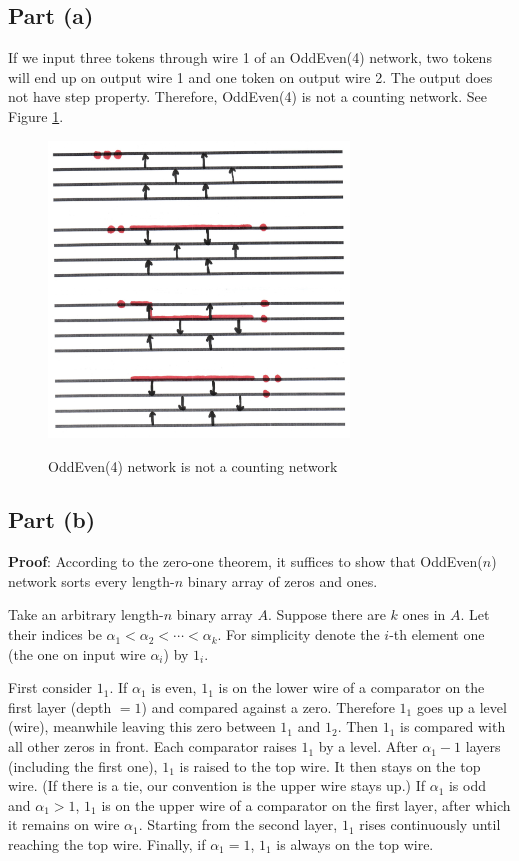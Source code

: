 \documentclass{article}
\begin{document}
\subsection{Part (a)}
If we input three tokens through wire 1 of an OddEven(4) network, two tokens will end up on output wire 1 and one token on output wire 2. The output does not have step property. Therefore, OddEven(4) is not a counting network. See Figure \ref{oddeven}.
\begin{figure}[!htbp]
\centering
\includegraphics[width=8cm]{oddeven.jpg}\\
\caption{OddEven(4) network is not a counting network}\label{oddeven}
\end{figure}

\subsection{Part (b)}
\noindent\textbf{Proof}:
According to the zero-one theorem, it suffices to show that OddEven($n$) network sorts every length-$n$ binary array of zeros and ones.

Take an arbitrary length-$n$ binary array $A$. Suppose there are $k$ ones in $A$. Let their indices be $\alpha_1<\alpha_2<\cdots<\alpha_k$. For simplicity denote the $i$-th element one (the one on input wire $\alpha_i$) by $1_i$.

First consider $1_1$. If $\alpha_1$ is even, $1_1$ is on the lower wire of a comparator on the first layer (depth $=1$) and compared against a zero. Therefore $1_1$ goes up a level (wire), meanwhile leaving this zero between $1_1$ and $1_2$. Then $1_1$ is compared with all other zeros in front. Each comparator raises $1_1$ by a level. After $\alpha_1-1$ layers (including the first one), $1_1$ is raised to the top wire. It then stays on the top wire. (If there is a tie, our convention is the upper wire stays up.) If $\alpha_1$ is odd and $\alpha_1>1$, $1_1$ is on the upper wire of a comparator on the first layer, after which it remains on wire $\alpha_1$. Starting from the second layer, $1_1$ rises continuously until reaching the top wire. Finally, if $\alpha_1=1$, $1_1$ is always on the top wire.
\end{document}
